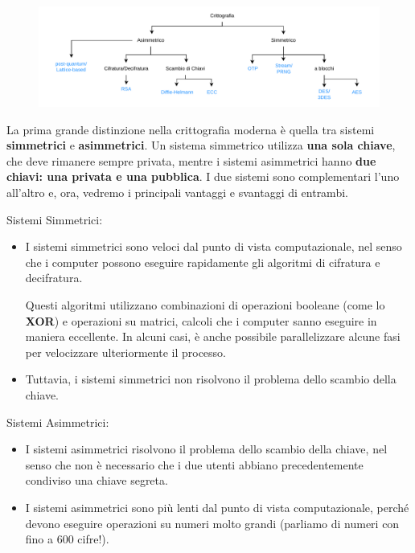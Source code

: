 \documentclass{rapport}
\begin{document}
\begin{figure}[h]
    \centering
    \includegraphics[width=\linewidth]{logos/0_4_cripto.pdf}
\end{figure}





La prima grande distinzione nella crittografia moderna è quella tra sistemi \textbf{simmetrici} e \textbf{asimmetrici}. Un sistema simmetrico utilizza \textbf{una sola chiave}, che deve rimanere sempre privata, mentre i sistemi asimmetrici hanno \textbf{due chiavi: una privata e una pubblica}. I due sistemi sono complementari l’uno all’altro e, ora, vedremo i principali vantaggi e svantaggi di entrambi.

Sistemi Simmetrici:

\begin{itemize}
    \item I sistemi simmetrici sono veloci dal punto di vista computazionale, nel senso che i computer possono eseguire rapidamente gli algoritmi di cifratura e decifratura. 
    
    Questi algoritmi utilizzano combinazioni di operazioni booleane (come lo \textbf{XOR}) e operazioni su matrici, calcoli che i computer sanno eseguire in maniera eccellente. In alcuni casi, è anche possibile parallelizzare alcune fasi per velocizzare ulteriormente il processo.
     
    \item Tuttavia, i sistemi simmetrici non risolvono il problema dello scambio della chiave.
\end{itemize}

Sistemi Asimmetrici:

\begin{itemize}
    \item I sistemi asimmetrici risolvono il problema dello scambio della chiave, nel senso che non è necessario che i due utenti abbiano precedentemente condiviso una chiave segreta.
    \item I sistemi asimmetrici sono più lenti dal punto di vista computazionale, perché devono eseguire operazioni su numeri molto grandi (parliamo di numeri con fino a 600 cifre!).
\end{itemize}
\end{document}
